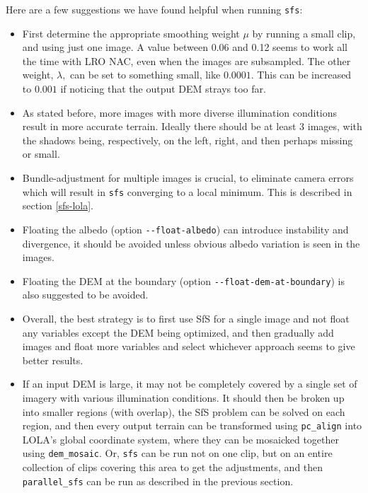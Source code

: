 Here are a few suggestions we have found helpful when running \texttt{sfs}:

\begin{itemize}{}

\item First determine the appropriate smoothing weight $\mu$ by running a
  small clip, and using just one image. A value between 0.06 and 0.12 seems to work 
  all the time with LRO NAC, even when the images are subsampled. The other weight, $\lambda,$ can
  be set to something small, like $0.0001.$ This can be increased to $0.001$ if noticing
  that the output DEM strays too far. 

\item As stated before, more images with more diverse illumination conditions
  result in more accurate terrain. Ideally there should be at least 3 images, with the shadows
  being, respectively, on the left, right, and then perhaps missing or small. 

\item Bundle-adjustment for multiple images is crucial, to eliminate
  camera errors which will result in \texttt{sfs} converging to a local
  minimum. This is described in section \ref{sfs-lola}.

\item Floating the albedo (option \texttt{-\/-float-albedo}) can
  introduce instability and divergence, it should be avoided unless
  obvious albedo variation is seen in the images.

\item Floating the DEM at the boundary (option
  \texttt{-\/-float-dem-at-boundary}) is also suggested to be avoided.

\item Overall, the best strategy is to first use SfS for a single image
  and not float any variables except the DEM being optimized, and then
  gradually add images and float more variables and select whichever
  approach seems to give better results.

\item If an input DEM is large, it may not be completely covered by a
  single set of imagery with various illumination conditions.  It should
  then be broken up into smaller regions (with overlap), the SfS problem
  can be solved on each region, and then every output terrain can be
  transformed using \texttt{pc\_align} into LOLA's global coordinate
  system, where they can be mosaicked together using
  \texttt{dem\_mosaic}. Or, \texttt{sfs} can be run not on one clip, but
  on an entire collection of clips covering this area to get the
  adjustments, and then \texttt{parallel\_sfs} can be run as described in
  the previous section. 


\end{itemize}
